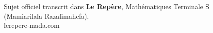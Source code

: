 \documentclass[11pt,a5paper,oneside,openany]{book}
\begin{document}
\small



\vfill
\begin{center}
	\footnotesize\color{gray}
	Sujet officiel transcrit dans \textbf{Le Repère}, Mathématiques Terminale S
	(Mamiarilala Razafimahefa).\\
	lerepere-mada.com
\end{center}
\end{document}
